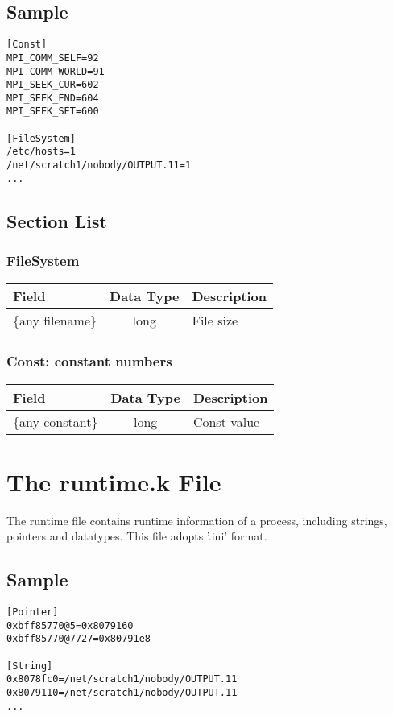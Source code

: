 \documentclass{article}
\begin{document}
\subsection{Sample}
\label{sec:SampleFS}
\begin{verbatim}
[Const]
MPI_COMM_SELF=92
MPI_COMM_WORLD=91
MPI_SEEK_CUR=602
MPI_SEEK_END=604
MPI_SEEK_SET=600

[FileSystem]
/etc/hosts=1
/net/scratch1/nobody/OUTPUT.11=1
...
\end{verbatim}

\subsection{Section List}
\label{sec:FSSectionList}

\subsubsection{FileSystem}
\label{sec:FileSystem}
\begin{flushleft}
  \begin{tabular}{l | c | l}
    Field & Data Type & Description\\\hline
    \{any filename\} & long & File size\\
  \end{tabular}
\end{flushleft}

\subsubsection{Const: constant numbers}
\label{sec:Const}
\begin{flushleft}
  \begin{tabular}{l | c | l}
    Field & Data Type & Description\\\hline
    \{any constant\} & long & Const value\\
  \end{tabular}
\end{flushleft}

\section{The runtime.k File}
\label{sec:TheRuntimeKFile}
The runtime file contains runtime information of a process, including strings, pointers and datatypes. This file adopts '.ini' format.

\subsection{Sample}
\label{sec:SampleRuntime}
\begin{verbatim}
[Pointer]
0xbff85770@5=0x8079160
0xbff85770@7727=0x80791e8

[String]
0x8078fc0=/net/scratch1/nobody/OUTPUT.11
0x8079110=/net/scratch1/nobody/OUTPUT.11
...
\end{verbatim}
\end{document}
